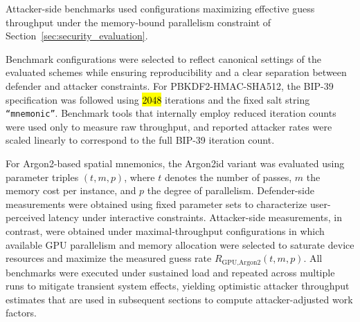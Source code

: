 \documentclass[mathematics,article,accept,pdftex,moreauthors]{Definitions/mdpi}
\begin{document}
{Attacker-side benchmarks used configurations maximizing effective guess throughput under the memory-bound parallelism constraint of Section~\ref{sec:security_evaluation}.}

Benchmark configurations were selected to reflect canonical settings of the evaluated schemes while ensuring reproducibility and a clear separation between defender and attacker constraints. For PBKDF2-HMAC-SHA512, the BIP-39 specification was followed using \hl{2048} %
 iterations and the fixed salt string \texttt{``mnemonic''}. Benchmark tools that internally employ reduced iteration counts were used only to measure raw throughput, and reported attacker rates were scaled linearly to correspond to the full BIP-39 iteration count.

For Argon2-based spatial mnemonics, the Argon2id variant was evaluated using parameter triples $(t,m,p)$, where $t$ denotes the number of passes, $m$ the memory cost per instance, and $p$ the degree of parallelism. Defender-side measurements were obtained using fixed parameter sets to characterize user-perceived latency under interactive constraints. Attacker-side measurements, in contrast, were obtained under maximal-throughput configurations in which available GPU parallelism and memory allocation were selected to saturate device resources and maximize the measured guess rate $R_{\text{GPU,Argon2}}(t,m,p)$. All benchmarks were executed under sustained load and repeated across multiple runs to mitigate transient system effects, yielding optimistic attacker throughput estimates that are used in subsequent sections to compute attacker-adjusted work factors.
\end{document}
